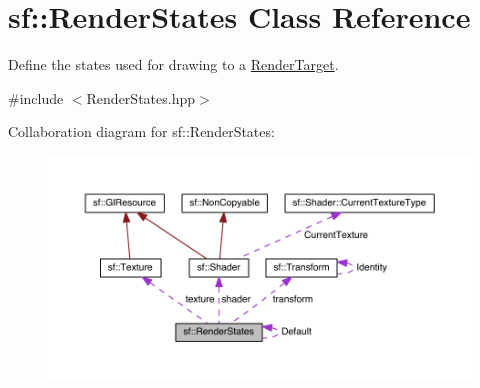 \hypertarget{classsf_1_1_render_states}{\section{sf\-:\-:Render\-States Class Reference}
\label{classsf_1_1_render_states}
}


Define the states used for drawing to a \hyperlink{classsf_1_1_render_target}{Render\-Target}.  




{\ttfamily \#include $<$Render\-States.\-hpp$>$}



Collaboration diagram for sf\-:\-:Render\-States\-:
\nopagebreak
\begin{figure}[H]
\begin{center}
\leavevmode
\includegraphics[width=350pt]{classsf_1_1_render_states__coll__graph}
\end{center}
\end{figure}

